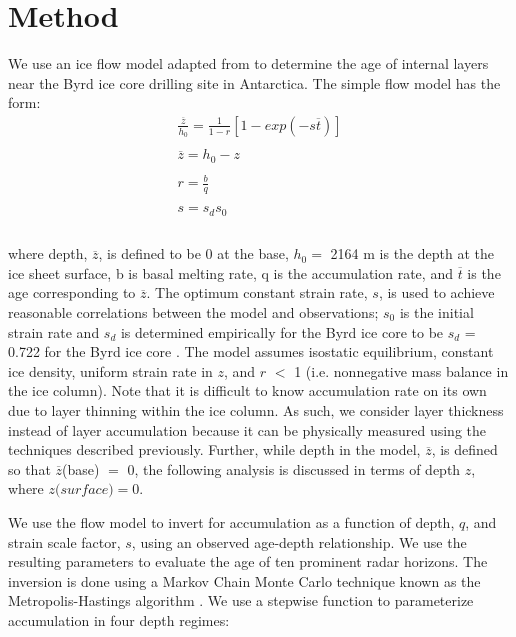 \documentclass[12pt]{article}
\begin{document}
\section{Method}\label{method}

We use an ice flow model adapted from \citet{morland2009} to determine the age of internal layers near the Byrd ice core drilling site in Antarctica.  The simple flow model has the form:
\begin{equation}
\begin{array}{l}
\displaystyle \frac{\overline{z}}{h_0} = \frac{1}{1 - r} [1 - exp(-s \overline{t})]\\
\\
\displaystyle \overline{z} = h_0 - z\\
\\
\displaystyle r = \frac{b}{q}\\
\\
\displaystyle s = s_ds_0\\
\end{array}
\end{equation}
\\

where depth, $\overline{z}$, is defined to be 0 at the base, $h_0 =$ 2164 m is the depth at the ice sheet surface, b is basal melting rate, q is the accumulation rate, and $\overline{t}$ is the age corresponding to $\overline{z}$. The optimum constant strain rate, $\textit{s}$, is used to achieve reasonable correlations between the model and observations; $s_0$ is the initial strain rate and $s_d$ is determined empirically for the Byrd ice core to be $s_d$ = 0.722 for the Byrd ice core \citep{morland2009}. The model assumes isostatic equilibrium, constant ice density, uniform strain rate in $\textit{z}$, and $\textit{r}$ $<$ 1 (i.e. nonnegative mass balance in the ice column). Note that it is difficult to know accumulation rate on its own due to layer thinning within the ice column. As such, we consider layer thickness instead of layer accumulation because it can be physically measured using the techniques described previously. Further, while depth in the model, $\overline{z}$, is defined so that $\overline{z}$(base) $=$ 0, the following analysis is discussed in terms of depth $\textit{z}$, where $\textit{z(surface)} = 0$.

We use the flow model to invert for accumulation as a function of depth, $\textit{q}$, and strain scale factor, $\textit{s}$, using an observed age-depth relationship. We use the resulting parameters to evaluate the age of ten prominent radar horizons. The inversion is done using a Markov Chain Monte Carlo technique known as the Metropolis-Hastings algorithm \cite{metropolis1953}. We use a stepwise function to parameterize accumulation in four depth regimes:
\end{document}
